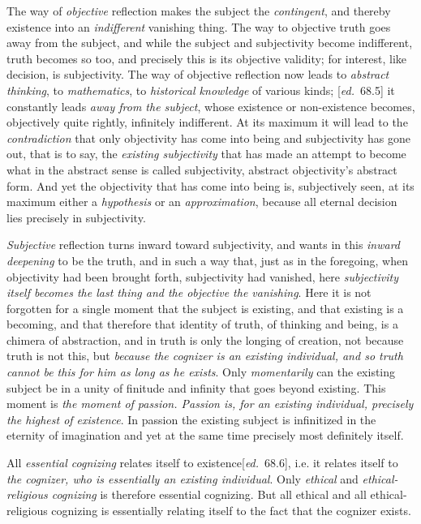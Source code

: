 \documentclass[12pt,a4paper,openany]{book}
\newcommand{\kpage}[1]{\marginnote{\footnotesize\textit{[#1]}}}
\newcommand{\ed}[1]{{\small[\textit{ed.}\ #1]}}
\begin{document}
The way of \emph{objective} reflection makes the subject the \emph{contingent}, and
thereby existence into an \emph{indifferent} vanishing thing. The way to
objective truth goes away from the subject, and while the subject and
subjectivity become indifferent, truth becomes so too, and
precisely this is its objective validity; for interest, like
decision, is subjectivity. The way of objective reflection
now leads to \emph{abstract thinking}, to \emph{mathematics}, to \emph{historical knowledge} of various
kinds; \ed{68.5} it constantly leads \emph{away from the subject}, whose existence
or non-existence becomes, objectively quite rightly, infinitely indifferent.
At its maximum it will lead to the \emph{contradiction} that only objectivity
has come into being and subjectivity has gone out, that is to say, the
\emph{existing subjectivity} that has made an attempt to become what in the
abstract sense is called subjectivity, abstract objectivity's
\kpage{118}abstract form. And yet the objectivity that has come into being is,
subjectively seen, at its maximum either a \emph{hypothesis} or an \emph{approximation},
because all eternal decision lies precisely in subjectivity.

\emph{Subjective} reflection turns inward toward subjectivity,
and wants in this \emph{inward deepening} to be the truth, and in such a way that, just as
in the foregoing, when objectivity had been brought forth, subjectivity
had vanished, here \emph{subjectivity itself becomes the last thing and the objective
the vanishing}. Here it is not forgotten for a single moment that the subject is existing,
and that existing is a becoming, and that therefore that identity of truth,
of thinking and being, is a chimera of abstraction,
and in truth is only the longing of creation, not because truth
is not this, but \emph{because the cognizer is an existing individual, and so
truth cannot be this for him as long as he exists}. Only \emph{momentarily}
can the existing subject be in a unity of finitude and infinity
that goes beyond existing. This moment is \emph{the moment of
passion. Passion is, for an existing individual, precisely the highest of existence}. In passion
the existing subject is infinitized in the eternity of imagination
and yet at the same time precisely most definitely itself.

All \emph{essential cognizing} relates itself to existence\ed{68.6}, i.e. it
relates itself to \emph{the cognizer, who is essentially an existing individual}. Only
\emph{ethical} and \emph{ethical-religious cognizing} is therefore essential cognizing.
But all ethical and all ethical-religious cognizing is essentially relating itself
to the fact that the cognizer exists.
\end{document}

